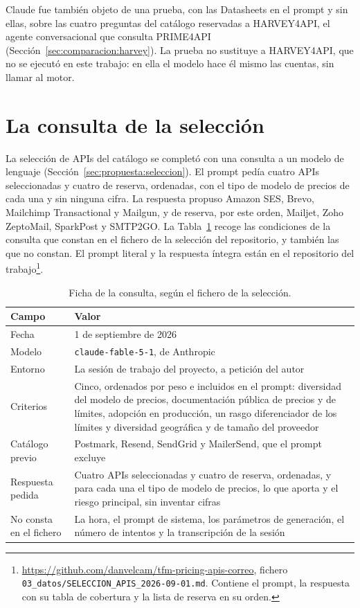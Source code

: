 Claude fue también objeto de una prueba, con las Datasheets en el prompt y sin ellas, sobre las cuatro preguntas del catálogo reservadas a HARVEY4API, el agente conversacional que consulta PRIME4API (Sección~\ref{sec:comparacion:harvey}).
La prueba no sustituye a HARVEY4API, que no se ejecutó en este trabajo: en ella el modelo hace él mismo las cuentas, sin llamar al motor.

\section{La consulta de la selección}

La selección de APIs del catálogo se completó con una consulta a un modelo de lenguaje (Sección~\ref{sec:propuesta:seleccion}).
El prompt pedía cuatro APIs seleccionadas y cuatro de reserva, ordenadas, con el tipo de modelo de precios de cada una y sin ninguna cifra.
La respuesta propuso Amazon SES, Brevo, Mailchimp Transactional y Mailgun, y de reserva, por este orden, Mailjet, Zoho ZeptoMail, SparkPost y SMTP2GO.
La Tabla~\ref{tab:uso-ia:ficha} recoge las condiciones de la consulta que constan en el fichero de la selección del repositorio, y también las que no constan.
El prompt literal y la respuesta íntegra están en el repositorio del trabajo\footnote{\url{https://github.com/danvelcam/tfm-pricing-apis-correo}, fichero \texttt{03\_datos/SELECCION\_APIS\_2026-09-01.md}. Contiene el prompt, la respuesta con su tabla de cobertura y la lista de reserva en su orden.}.

\begin{table}[H]
\centering
\small
\begin{tabular}{|p{4.2cm}|p{9.4cm}|}
\hline
\raggedright \textbf{Campo} & \raggedright \textbf{Valor} \tabularnewline
\hline
\raggedright Fecha & \raggedright 1 de septiembre de 2026 \tabularnewline
\hline
\raggedright Modelo & \raggedright \texttt{claude-fable-5-1}, de Anthropic \tabularnewline
\hline
\raggedright Entorno & \raggedright La sesión de trabajo del proyecto, a petición del autor \tabularnewline
\hline
\raggedright Criterios & \raggedright Cinco, ordenados por peso e incluidos en el prompt: diversidad del modelo de precios, documentación pública de precios y de límites, adopción en producción, un rasgo diferenciador de los límites y diversidad geográfica y de tamaño del proveedor \tabularnewline
\hline
\raggedright Catálogo previo & \raggedright Postmark, Resend, SendGrid y MailerSend, que el prompt excluye \tabularnewline
\hline
\raggedright Respuesta pedida & \raggedright Cuatro APIs seleccionadas y cuatro de reserva, ordenadas, y para cada una el tipo de modelo de precios, lo que aporta y el riesgo principal, sin inventar cifras \tabularnewline
\hline
\raggedright No consta en el fichero & \raggedright La hora, el prompt de sistema, los parámetros de generación, el número de intentos y la transcripción de la sesión \tabularnewline
\hline
\end{tabular}
\caption{Ficha de la consulta, según el fichero de la selección.}
\label{tab:uso-ia:ficha}
\end{table}

